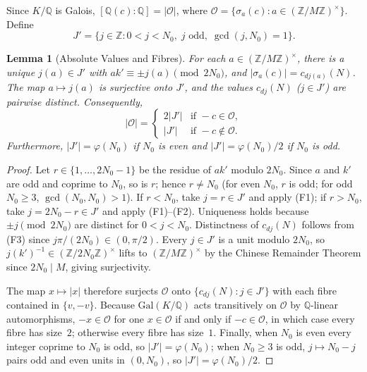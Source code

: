 \documentclass[11pt]{article}
\newtheorem{lemma}[theorem]{Lemma}
\begin{document}
Since $K/\mathbb{Q}$ is Galois, $[\mathbb{Q}(c) : \mathbb{Q}] = |\mathcal{O}|$, where $\mathcal{O} = \{\sigma_a(c) : a \in (\mathbb{Z}/M\mathbb{Z})^\times\}$. Define
\[
J' = \{j \in \mathbb{Z} : 0 < j < N_0,\; j \text{ odd},\; \gcd(j, N_0) = 1\}.
\]

\begin{lemma}[Absolute Values and Fibres]\label{lem:fibres}
For each $a \in (\mathbb{Z}/M\mathbb{Z})^\times$, there is a unique $j(a) \in J'$ with $a k' \equiv \pm j(a) \pmod{2N_0}$, and $|\sigma_a(c)| = c_{d j(a)}(N)$. The map $a \mapsto j(a)$ is surjective onto $J'$, and the values $c_{dj}(N)$ ($j \in J'$) are pairwise distinct. Consequently,
\[
|\mathcal{O}| =
\begin{cases}
  2|J'| & \text{if } -c \in \mathcal{O}, \\
  |J'|  & \text{if } -c \notin \mathcal{O}.
\end{cases}
\]
Furthermore, $|J'| = \varphi(N_0)$ if $N_0$ is even and $|J'| = \varphi(N_0)/2$ if $N_0$ is odd.
\end{lemma}

\begin{proof}
Let $r \in \{1, \dots, 2N_0 - 1\}$ be the residue of $a k'$ modulo $2N_0$. Since $a$ and $k'$ are odd and coprime to $N_0$, so is $r$; hence $r \ne N_0$ (for even $N_0$, $r$ is odd; for odd $N_0 \ge 3$, $\gcd(N_0, N_0) > 1$). If $r < N_0$, take $j = r \in J'$ and apply (F1); if $r > N_0$, take $j = 2N_0 - r \in J'$ and apply (F1)--(F2). Uniqueness holds because $\pm j \pmod{2N_0}$ are distinct for $0 < j < N_0$. Distinctness of $c_{dj}(N)$ follows from (F3) since $j\pi/(2N_0) \in (0, \pi/2)$. Every $j \in J'$ is a unit modulo $2N_0$, so $j(k')^{-1} \in (\mathbb{Z}/2N_0\mathbb{Z})^\times$ lifts to $(\mathbb{Z}/M\mathbb{Z})^\times$ by the Chinese Remainder Theorem since $2N_0 \mid M$, giving surjectivity.

The map $x \mapsto |x|$ therefore surjects $\mathcal{O}$ onto $\{c_{dj}(N) : j \in J'\}$ with each fibre contained in $\{v, -v\}$. Because $\mathrm{Gal}(K/\mathbb{Q})$ acts transitively on $\mathcal{O}$ by $\mathbb{Q}$-linear automorphisms, $-x \in \mathcal{O}$ for one $x \in \mathcal{O}$ if and only if $-c \in \mathcal{O}$, in which case every fibre has size~$2$; otherwise every fibre has size~$1$. Finally, when $N_0$ is even every integer coprime to $N_0$ is odd, so $|J'| = \varphi(N_0)$; when $N_0 \ge 3$ is odd, $j \mapsto N_0 - j$ pairs odd and even units in $(0, N_0)$, so $|J'| = \varphi(N_0)/2$.
\end{proof}
\end{document}
